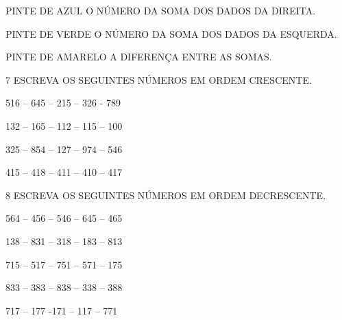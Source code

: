 \begin{escolha}[itemsep=0pt]
\item PINTE DE AZUL O NÚMERO DA SOMA DOS DADOS DA DIREITA.

\item PINTE DE VERDE O NÚMERO DA SOMA DOS DADOS DA ESQUERDA.

\item PINTE DE AMARELO A DIFERENÇA ENTRE AS SOMAS.
\end{escolha}


\num{7} ESCREVA OS SEGUINTES NÚMEROS EM ORDEM CRESCENTE.

\begin{escolha}
\item 516 -- 645 -- 215 -- 326 - 789


\item 132 -- 165 -- 112 -- 115 -- 100


\item 325 -- 854 -- 127 -- 974 -- 546


\item 415 -- 418 -- 411 -- 410 -- 417


\end{escolha}


\num{8} ESCREVA OS SEGUINTES NÚMEROS EM ORDEM DECRESCENTE.

\begin{escolha}
\item 564 -- 456 -- 546 -- 645 -- 465

\item 138 -- 831 -- 318 -- 183 -- 813

\item 715 -- 517 -- 751 -- 571 -- 175

\item 833 -- 383 -- 838 -- 338 -- 388

\item 717 -- 177 -171 -- 117 -- 771

\end{escolha}

